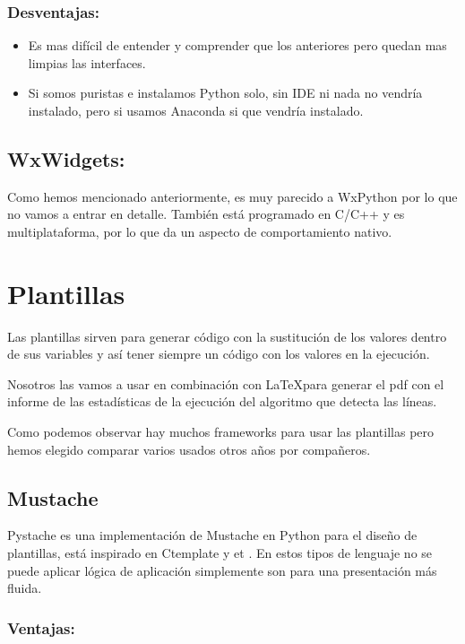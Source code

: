 \subsubsection{Desventajas:}

\begin{itemize}
\item Es mas difícil de entender y comprender que los anteriores pero quedan mas limpias las interfaces.
\item Si somos puristas e instalamos Python solo, sin IDE ni nada no vendría instalado, pero si usamos Anaconda si que vendría instalado.
\end{itemize}

\subsection{WxWidgets:}
Como hemos mencionado anteriormente, es muy parecido a WxPython por lo que no vamos a entrar en detalle. También está programado en C/C++ y es multiplataforma, por lo que da un aspecto de comportamiento nativo.



\section{Plantillas}
Las plantillas sirven para generar código con la sustitución de los valores dentro de sus variables y así tener siempre un código con los valores en la ejecución.

Nosotros las vamos a usar en combinación con \LaTeX para generar el pdf con el informe de las estadísticas de la ejecución del algoritmo que detecta las líneas.

Como podemos observar hay muchos frameworks para usar las plantillas pero hemos elegido comparar varios usados otros años por compañeros.
\subsection{Mustache}
Pystache es una implementación de Mustache en Python para el diseño de plantillas, está inspirado en Ctemplate \cite{GitHub:CTemplate} y et \cite{et}.
En estos tipos de lenguaje no se puede aplicar lógica de aplicación simplemente son para una presentación más fluida.

\subsubsection{Ventajas:}

